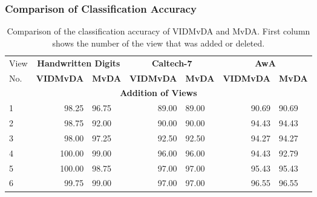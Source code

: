 \subsubsection{Comparison of Classification Accuracy}
\label{ssubs:VIDMvDA_Acc}
\begin{table}[t]
	\centering
	\caption{Comparison of the classification accuracy of VIDMvDA and MvDA. First column shows the number of the view that was added or deleted.}
	\label{tab:VIDMvDA_Res_Acc}
	\begin{tabular}{l r l r l r l} \hline
		View & \multicolumn{2}{c}{\textbf{Handwritten Digits}} & \multicolumn{2}{c}{\textbf{Caltech-7}} & \multicolumn{2}{c}{\textbf{AwA}} \\
		No. & \textbf{VIDMvDA} & \textbf{MvDA} & \textbf{VIDMvDA} & \textbf{MvDA} & \textbf{VIDMvDA} & \textbf{MvDA} \\ \hline
		\multicolumn{7}{c}{\textbf{Addition of Views}} \\ \hline
		1 &  98.25 \hspace{0.5cm} & 96.75 & 89.00 \hspace{0.5cm} & 89.00 & 90.69 \hspace{0.5cm} & 90.69 \\ 
		2 &  98.75 \hspace{0.5cm} & 92.00 & 90.00 \hspace{0.5cm} & 90.00 & 94.43 \hspace{0.5cm} & 94.43 \\ 
		3 &  98.00 \hspace{0.5cm} & 97.25 & 92.50 \hspace{0.5cm} & 92.50 & 94.27 \hspace{0.5cm} & 94.27 \\ 
		4 & 100.00 \hspace{0.5cm} & 99.00 & 96.00 \hspace{0.5cm} & 96.00 & 94.43 \hspace{0.5cm} & 92.79 \\ 
		5 & 100.00 \hspace{0.5cm} & 98.75 & 97.00 \hspace{0.5cm} & 97.00 & 95.43 \hspace{0.5cm} & 95.43 \\ 
		6 &  99.75 \hspace{0.5cm} & 99.00 & 97.00 \hspace{0.5cm} & 97.00 & 96.55 \hspace{0.5cm} & 96.55 \\ \hline


\end{tabular}
\end{table}

